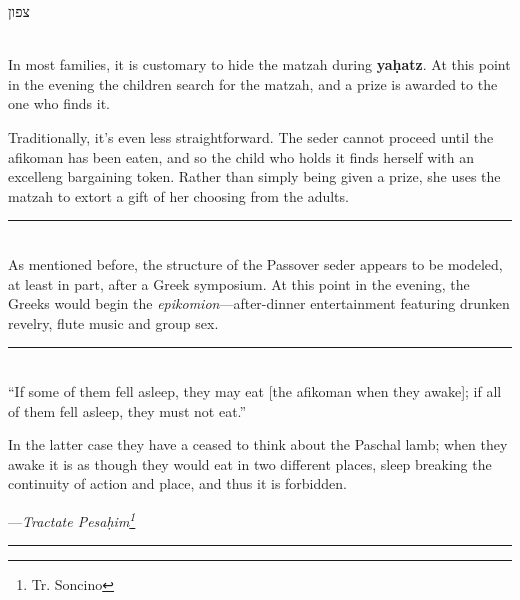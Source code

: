 \documentclass[a4paper,10pt,openany]{memoir}
\newcommand{\HgSource}[1]{\hfill{\small---\itshape{#1}}}
\newcommand{\hchapter}[1]{
  \begin{hebrew}
    \begin{Spacing}{.97}
      \newpage
      \strut

      \vspace{.15em}

      \noindent\Huge #1

      \vspace{1em}
    \end{Spacing}
  \end{hebrew}
}
\newcommand{\HgFill}{\vfill \hrule \vfill}
\newenvironment{HgEnglish}{\strut\\\noindent}{\vspace{1em}}
\begin{document}
\vfill

\hchapter{צפון}

\begin{HgEnglish}
In most families, it is customary to hide the matzah during {\bfseries
ya\d{h}atz}. At this point in the evening the children search for the matzah,
and a prize is awarded to the one who finds it.

Traditionally, it's even less straightforward. The seder cannot proceed until
the afikoman has been eaten, and so the child who holds it finds herself with an
excelleng bargaining token. Rather than simply being given a prize, she uses the
matzah to extort a gift of her choosing from the adults.
\end{HgEnglish}

\HgFill

\begin{HgEnglish}
  As mentioned before, the structure of the Passover seder appears to be
  modeled, at least in part, after a Greek symposium. At this point in the
  evening, the Greeks would begin the {\itshape epikomion}---after-dinner
  entertainment featuring drunken revelry, flute music and group sex.
\end{HgEnglish}

\HgFill

\begin{HgEnglish}
``If some of them fell asleep, they may eat [the afikoman when they awake]; if
all of them fell asleep, they must not eat.''

In the latter case they have a ceased to think about the Paschal lamb; when they
awake it is as though they would eat in two different places, sleep breaking the
continuity of action and place, and thus it is forbidden.

\HgSource{Tractate Pesa\d{h}im\footnote{Tr. Soncino}}\\
\end{HgEnglish}

\HgFill
\end{document}
